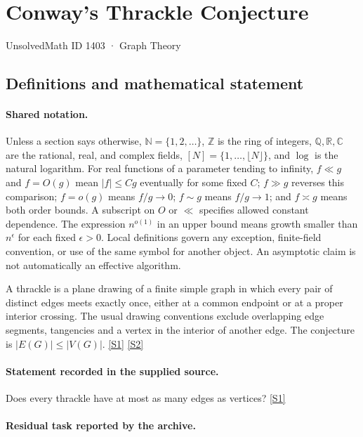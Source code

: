 \documentclass[11pt,a4paper]{article}
\newcommand{\N}{\mathbb{N}}
\newcommand{\Z}{\mathbb{Z}}
\newcommand{\Q}{\mathbb{Q}}
\newcommand{\R}{\mathbb{R}}
\newcommand{\C}{\mathbb{C}}
\newcommand{\sref}[2]{\hyperlink{source:#1:#2}{[S#2]}}
\begin{document}

\setcounter{section}{1402}

\section{Conway’s Thrackle Conjecture}\label{1403}

{\small\sffamily UnsolvedMath ID 1403 · Graph Theory}

\subsection{Definitions and mathematical statement}

\paragraph{Shared notation.}Unless a section says otherwise, $\N=\{1,2,\ldots\}$,
$\Z$ is the ring of integers, $\Q,\R,\C$ are the rational, real, and complex
fields, $[N]=\{1,\ldots,\lfloor N\rfloor\}$, and $\log$ is the natural
logarithm. For real functions of a parameter tending to infinity,
$f\ll g$ and $f=O(g)$ mean $|f|\leq Cg$ eventually for some fixed $C$;
$f\gg g$ reverses this comparison; $f=o(g)$ means $f/g\to0$;
$f\sim g$ means $f/g\to1$; and $f\asymp g$ means both order bounds.
A subscript on $O$ or $\ll$ specifies allowed constant dependence.
The expression $n^{o(1)}$ in an upper bound means growth smaller than
$n^\epsilon$ for each fixed $\epsilon>0$. Local definitions govern any
exception, finite-field convention, or use of the same symbol for another
object. An asymptotic claim is not automatically an effective algorithm.



A thrackle is a plane drawing of a finite simple graph in which every pair of distinct edges meets exactly once, either at a common endpoint or at a proper interior crossing. The usual drawing conventions exclude overlapping edge segments, tangencies and a vertex in the interior of another edge. The conjecture is $|E(G)|\leq|V(G)|$. \sref{1403}{1} \sref{1403}{2}

\paragraph{Statement recorded in the supplied source.}
Does every thrackle have at most as many edges as vertices? \sref{1403}{1}

\paragraph{Residual task reported by the archive.}
\end{document}
